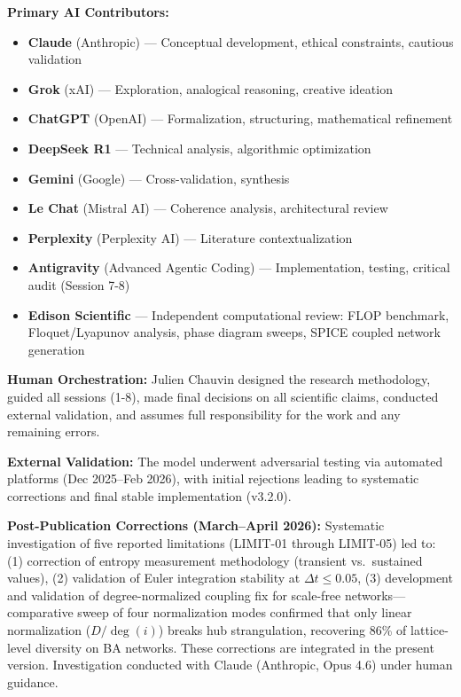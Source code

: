 \documentclass[11pt]{article}
\begin{document}
\textbf{Primary AI Contributors:}
\begin{itemize}
    \item \textbf{Claude} (Anthropic) --- Conceptual development, ethical constraints, cautious validation
    \item \textbf{Grok} (xAI) --- Exploration, analogical reasoning, creative ideation
    \item \textbf{ChatGPT} (OpenAI) --- Formalization, structuring, mathematical refinement
    \item \textbf{DeepSeek R1} --- Technical analysis, algorithmic optimization
    \item \textbf{Gemini} (Google) --- Cross-validation, synthesis
    \item \textbf{Le Chat} (Mistral AI) --- Coherence analysis, architectural review
    \item \textbf{Perplexity} (Perplexity AI) --- Literature contextualization
    \item \textbf{Antigravity} (Advanced Agentic Coding) --- Implementation, testing, critical audit (Session 7-8)
    \item \textbf{Edison Scientific} --- Independent computational review: FLOP benchmark, Floquet/Lyapunov analysis, phase diagram sweeps, SPICE coupled network generation
\end{itemize}

\textbf{Human Orchestration:} Julien Chauvin designed the research methodology, guided all sessions (1-8), made final decisions on all scientific claims, conducted external validation, and assumes full responsibility for the work and any remaining errors.

\textbf{External Validation:} The model underwent adversarial testing via automated platforms (Dec 2025--Feb 2026), with initial rejections leading to systematic corrections and final stable implementation (v3.2.0).

\textbf{Post-Publication Corrections (March--April 2026):} Systematic investigation of five reported limitations (LIMIT-01 through LIMIT-05) led to: (1) correction of entropy measurement methodology (transient vs.\ sustained values), (2) validation of Euler integration stability at $\Delta t \leq 0.05$, (3) development and validation of degree-normalized coupling fix for scale-free networks---comparative sweep of four normalization modes confirmed that only linear normalization ($D/\deg(i)$) breaks hub strangulation, recovering 86\% of lattice-level diversity on BA networks. These corrections are integrated in the present version. Investigation conducted with Claude (Anthropic, Opus 4.6) under human guidance.
\end{document}
